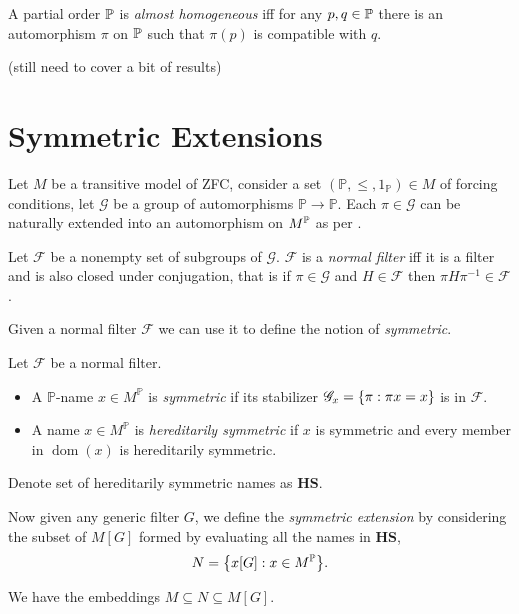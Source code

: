 \begin{definition}
    A partial order \(\P\) is \emph{almost homogeneous} iff
    for any \(p,q\in\P\) there is an automorphism \(\pi\) on \(\P\) such that \(\pi(p)\) is compatible with \(q\).
\end{definition}

(still need to cover a bit of results)






\section{Symmetric Extensions}

\renewcommand*{\G}{\mathscr{G}}
\newcommand*{\dom}{\operatorname{dom}}
Let \(M\) be a transitive model of ZFC, consider a set \((\mathbb{P}, \leq, 1_{\mathbb{P}}) \in M\) of forcing conditions,
let \(\G\) be a group of automorphisms \(\mathbb{P} \to \mathbb{P}\).
Each \(\pi\in \G\) can be naturally extended into an automorphism on \(M^\P\) as per .

\begin{definition}
    Let \(\mathscr{F}\) be a nonempty set of subgroups of \(\G\).
    \(\mathscr{F}\) is a \emph{normal filter} iff it is a filter and is also closed under conjugation, that is
    if \(\pi\in \G\) and \(H\in\mathscr{F}\) then \(\pi H \pi^{-1} \in\mathscr{F}\).
\end{definition}
Given a normal filter \(\mathscr{F}\) we can use it to define the notion of \emph{symmetric}.
\begin{definition}
    Let \(\mathscr{F}\) be a normal filter.
    \begin{itemize}
        \item A \(\mathbb{P}\)-name \(x\in M^{\mathbb{P}}\) is \emph{symmetric} if its stabilizer \(\G_x = \set{\pi: \pi x = x}\) is in \(\mathscr{F}\).
        \item A name \(x\in M^{\mathbb{P}}\) is \emph{hereditarily symmetric} if \(x\) is symmetric and every member in \(\dom(x)\) is hereditarily symmetric.
    \end{itemize}
    Denote set of hereditarily symmetric names as \(\mathbf{HS}\).
\end{definition}

\begin{definition}
    Now given any generic filter \(G\), we define the \emph{symmetric extension}
    by considering the subset of \(M[G]\) formed by evaluating all the names in \(\mathbf{HS}\),
    \[ N = \set{ x[G]: x\in M^{\mathbb{P}} }. \]
\end{definition}
\begin{observation}
    We have the embeddings \(M \subseteq N \subseteq M[G]\).
\end{observation}

